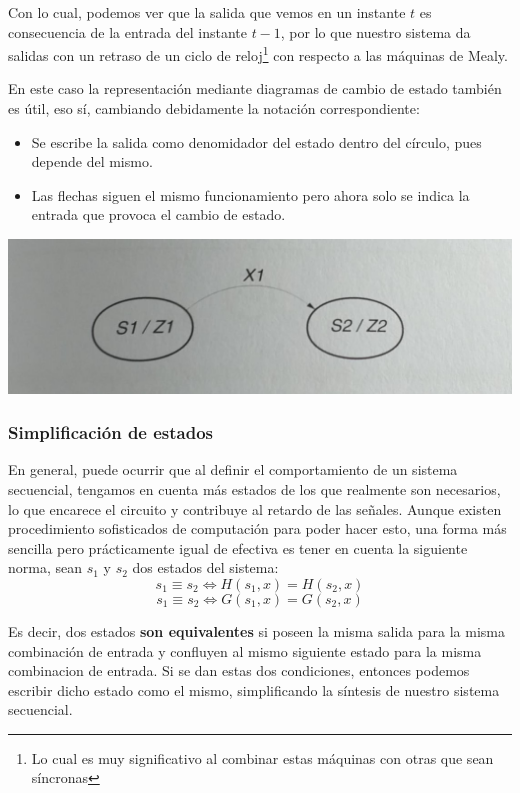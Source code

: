 \documentclass[a4paper,10pt]{book}
\begin{document}
Con lo cual, podemos ver que la salida que vemos en un instante $t$ es consecuencia de la entrada del instante $t-1$, por lo que nuestro sistema da salidas con un retraso de un ciclo de reloj\footnote{Lo cual es muy significativo al combinar estas máquinas con otras que sean síncronas} con respecto a las máquinas de Mealy.

En este caso la representación mediante diagramas de cambio de estado también es útil, eso sí, cambiando debidamente la notación correspondiente:
\begin{itemize}
\item Se escribe la salida como denomidador del estado dentro del círculo, pues depende del mismo.
\item Las flechas siguen el mismo funcionamiento pero ahora solo se indica la entrada que provoca el cambio de estado.
\end{itemize}
\begin{center}
\includegraphics[scale=0.35]{ejemplo_diagrama2}
\end{center}

\subsubsection*{Simplificación de estados}
En general, puede ocurrir que al definir el comportamiento de un sistema secuencial, tengamos en cuenta más estados de los que realmente son necesarios, lo que encarece el circuito y contribuye al retardo de las señales.
Aunque existen procedimiento sofisticados de computación para poder hacer esto, una forma más sencilla pero prácticamente igual de efectiva es tener en cuenta la siguiente norma, sean $s_1$ y $s_2$ dos estados del sistema:
$$s_1\equiv s_2 \Leftrightarrow H(s_1, x)=H(s_2, x)$$
$$s_1\equiv s_2 \Leftrightarrow G(s_1, x)=G(s_2, x)$$

Es decir, dos estados \textbf{son equivalentes} si poseen la misma salida para la misma combinación de entrada y confluyen al mismo siguiente estado para la misma combinacion de entrada. Si se dan estas dos condiciones, entonces podemos escribir dicho estado como el mismo, simplificando la síntesis de nuestro sistema secuencial.
\end{document}

